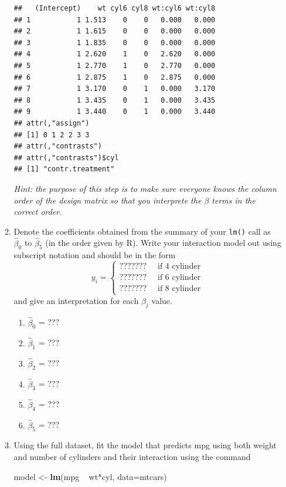 \documentclass[]{book}
\newenvironment{Shaded}{\begin{snugshade}}{\end{snugshade}}
\newcommand{\KeywordTok}[1]{\textcolor[rgb]{0.13,0.29,0.53}{\textbf{{#1}}}}
\newcommand{\DataTypeTok}[1]{\textcolor[rgb]{0.13,0.29,0.53}{{#1}}}
\newcommand{\StringTok}[1]{\textcolor[rgb]{0.31,0.60,0.02}{{#1}}}
\newcommand{\NormalTok}[1]{{#1}}
\providecommand{\tightlist}{%
  \setlength{\itemsep}{0pt}\setlength{\parskip}{0pt}}
\theoremstyle{definition}
\theoremstyle{definition}
\theoremstyle{remark}
\begin{document}
\begin{enumerate}
\begin{enumerate}
\begin{verbatim}
##   (Intercept)    wt cyl6 cyl8 wt:cyl6 wt:cyl8
## 1           1 1.513    0    0   0.000   0.000
## 2           1 1.615    0    0   0.000   0.000
## 3           1 1.835    0    0   0.000   0.000
## 4           1 2.620    1    0   2.620   0.000
## 5           1 2.770    1    0   2.770   0.000
## 6           1 2.875    1    0   2.875   0.000
## 7           1 3.170    0    1   0.000   3.170
## 8           1 3.435    0    1   0.000   3.435
## 9           1 3.440    0    1   0.000   3.440
## attr(,"assign")
## [1] 0 1 2 2 3 3
## attr(,"contrasts")
## attr(,"contrasts")$cyl
## [1] "contr.treatment"
\end{verbatim}

    \emph{Hint: the purpose of this step is to make sure everyone knows
    the column order of the design matrix so that you interprete the
    \(\beta\) terms in the correct order.}
  \item
    Denote the coefficients obtained from the summary of your
    \texttt{lm()} call as \(\hat{\beta}_{0}\) to \(\hat{\beta}_{5}\) (in
    the order given by R). Write your interaction model out using
    subscript notation and should be in the form \[y_{i}=\begin{cases}
    ??????? & \;\;\textrm{if 4 cylinder}\\
    ??????? & \;\;\textrm{if 6 cylinder}\\
    ??????? & \;\;\textrm{if 8 cylinder}
    \end{cases}\] and give an interpretation for each \(\beta_{j}\)
    value.

    \begin{enumerate}
    \def\labelenumiii{\roman{enumiii}.}
    \tightlist
    \item
      \(\hat{\beta}_0\) = ???
    \item
      \(\hat{\beta}_1\) = ???
    \item
      \(\hat{\beta}_2\) = ???
    \item
      \(\hat{\beta}_3\) = ???
    \item
      \(\hat{\beta}_4\) = ???
    \item
      \(\hat{\beta}_5\) = ???
    \end{enumerate}
  \item
    Using the full dataset, fit the model that predicts mpg using both
    weight and number of cylinders and their interaction using the
    command

\begin{Shaded}
\begin{Highlighting}[]
\NormalTok{model <-}\StringTok{ }\KeywordTok{lm}\NormalTok{(mpg ~}\StringTok{ }\NormalTok{wt*cyl, }\DataTypeTok{data=}\NormalTok{mtcars)}
\end{Highlighting}
\end{Shaded}


\end{enumerate}
\end{enumerate}
\end{document}
